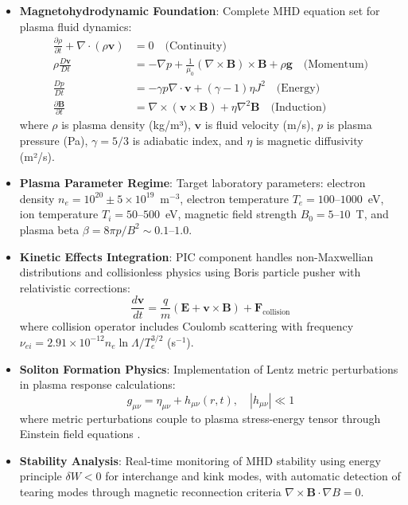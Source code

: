\documentclass[12pt,a4paper]{article}
\begin{document}
\begin{itemize}
\item \textbf{Magnetohydrodynamic Foundation}: Complete MHD equation set for plasma fluid dynamics:
\begin{align}
\frac{\partial \rho}{\partial t} + \nabla \cdot (\rho \mathbf{v}) &= 0 \quad \text{(Continuity)} \\
\rho \frac{D\mathbf{v}}{Dt} &= -\nabla p + \frac{1}{\mu_0}(\nabla \times \mathbf{B}) \times \mathbf{B} + \rho \mathbf{g} \quad \text{(Momentum)} \\
\frac{Dp}{Dt} &= -\gamma p \nabla \cdot \mathbf{v} + (\gamma - 1) \eta J^2 \quad \text{(Energy)} \\
\frac{\partial \mathbf{B}}{\partial t} &= \nabla \times (\mathbf{v} \times \mathbf{B}) + \eta \nabla^2 \mathbf{B} \quad \text{(Induction)}
\end{align}
where $\rho$ is plasma density (kg/m³), $\mathbf{v}$ is fluid velocity (m/s), $p$ is plasma pressure (Pa), $\gamma = 5/3$ is adiabatic index, and $\eta$ is magnetic diffusivity (m²/s).

\item \textbf{Plasma Parameter Regime}: Target laboratory parameters: electron density $n_e = 10^{20} \pm 5 \times 10^{19}$~m$^{-3}$, electron temperature $T_e = 100$--$1000$~eV, ion temperature $T_i = 50$--$500$~eV, magnetic field strength $B_0 = 5$--$10$~T, and plasma beta $\beta = 8\pi p / B^2 \sim 0.1$--$1.0$.

\item \textbf{Kinetic Effects Integration}: PIC component handles non-Maxwellian distributions and collisionless physics using Boris particle pusher with relativistic corrections:
\begin{equation}
\frac{d\mathbf{v}}{dt} = \frac{q}{m}\left(\mathbf{E} + \mathbf{v} \times \mathbf{B}\right) + \mathbf{F}_{\text{collision}}
\end{equation}
where collision operator includes Coulomb scattering with frequency $\nu_{ei} = 2.91 \times 10^{-12} n_e \ln\Lambda / T_e^{3/2}$ (s$^{-1}$).

\item \textbf{Soliton Formation Physics}: Implementation of Lentz metric perturbations in plasma response calculations:
\begin{equation}
g_{\mu\nu} = \eta_{\mu\nu} + h_{\mu\nu}(r,t), \quad |h_{\mu\nu}| \ll 1
\end{equation}
where metric perturbations couple to plasma stress-energy tensor through Einstein field equations \cite{parker2009quantum}.

\item \textbf{Stability Analysis}: Real-time monitoring of MHD stability using energy principle $\delta W < 0$ for interchange and kink modes, with automatic detection of tearing modes through magnetic reconnection criteria $\nabla \times \mathbf{B} \cdot \nabla B = 0$.
\end{itemize}
\end{document}
